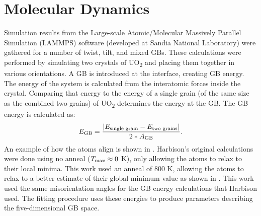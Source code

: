 \documentclass[twoside,senior]{BYUPhys}
\begin{document}
\section{Molecular Dynamics\label{methods:MD}}
Simulation results from the Large-scale Atomic/Molecular Massively Parallel Simulation (LAMMPS) software (developed at Sandia National Laboratory\cite{plimpton1995}) were gathered for a number of twist, tilt, and mixed GBs.  These calculations were performed by simulating two crystals of UO\textsubscript{2} and placing them together in various orientations.  A GB is introduced at the interface, creating GB energy.  The energy of the system is calculated from the interatomic forces inside the crystal.  Comparing that energy to the energy of a single grain (of the same size as the combined two grains) of UO\textsubscript{2} determines the energy at the GB.\cite{harbison2015}  The GB energy is calculated as:\cite{butterfield2013}
\begin{equation}
E_{\textnormal{GB}}=\frac{|E_{\textnormal{single grain}} - E_{\textnormal{two grains}}|}{2*A_{\textnormal{GB}}}.
\end{equation} 
An example of how the atoms align is shown in . Harbison's original calculations\cite{harbison2015} were done using no anneal ($T_{\textnormal{max}}\approx0$ K), only allowing the atoms to relax to their local minima.  This work used an anneal of 800 K, allowing the atoms to relax to a better estimate of their global minimum value as shown in .  This work used the same misorientation angles for the GB energy calculations that Harbison used.  The fitting procedure uses these energies to produce parameters describing the five-dimensional GB space.
\end{document}
